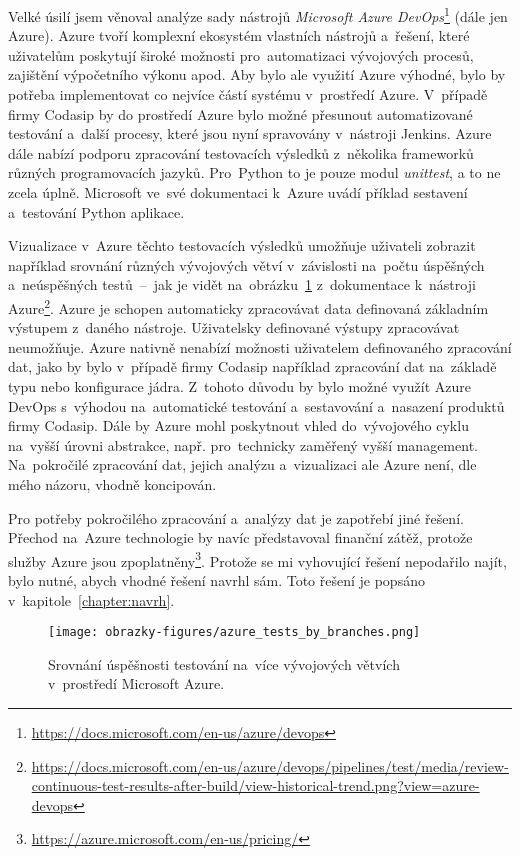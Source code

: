 Velké úsilí jsem věnoval analýze sady nástrojů \textit{Microsoft Azure DevOps}\footnote{\href{https://docs.microsoft.com/en-us/azure/devops}{https://docs.microsoft.com/en-us/azure/devops}}
(dále jen Azure). Azure tvoří komplexní ekosystém vlastních nástrojů a~řešení, které uživatelům poskytují široké
možnosti pro~automatizaci vývojových procesů, zajištění výpočetního výkonu apod. Aby bylo ale využití Azure výhodné,
bylo by potřeba implementovat co nejvíce částí systému v~prostředí Azure. V~případě firmy Codasip by do prostředí
Azure bylo možné přesunout automatizované testování a~další procesy, které jsou nyní spravovány v~nástroji Jenkins.
Azure dále nabízí podporu zpracování testovacích výsledků z~několika frameworků různých programovacích jazyků.
Pro~Python to je pouze modul \textit{unittest}, a to ne zcela úplně. Microsoft ve~své dokumentaci k~Azure uvádí
příklad sestavení a~testování Python aplikace.~\cite{AzurePythonDemo}

Vizualizace v~Azure těchto testovacích výsledků umožňuje uživateli zobrazit například srovnání různých vývojových
větví v~závislosti na~počtu úspěšných a~neúspěšných testů~--~jak je vidět na~obrázku~\ref{img:azure_tests_by_branches} z~dokumentace k~nástroji Azure\footnote{\href{https://docs.microsoft.com/en-us/azure/devops/pipelines/test/media/review-continuous-test-results-after-build/view-historical-trend.png?view=azure-devops}{https://docs.microsoft.com/en-us/azure/devops/pipelines/test/media/review-continuous-test-results-after-build/view-historical-trend.png?view=azure-devops}}. Azure je schopen automaticky zpracovávat data definovaná základním výstupem z~daného nástroje. Uživatelsky definované výstupy
zpracovávat neumožňuje. Azure nativně nenabízí možnosti uživatelem definovaného zpracování dat, jako by bylo v~případě firmy Codasip například zpracování dat na~základě typu nebo konfigurace jádra. Z~tohoto důvodu by bylo
možné využít Azure DevOps s~výhodou na~automatické testování a~sestavování a~nasazení produktů firmy Codasip. Dále by
Azure mohl poskytnout vhled do~vývojového cyklu na~vyšší úrovni abstrakce, např. pro~technicky zaměřený vyšší
management. Na~pokročilé zpracování dat, jejich analýzu a~vizualizaci ale Azure není, dle mého názoru, vhodně koncipován.

Pro potřeby pokročilého zpracování a~analýzy dat je zapotřebí jiné řešení. Přechod na~Azure technologie by navíc
představoval finanční zátěž, protože služby Azure jsou zpoplatněny\footnote{\href{https://azure.microsoft.com/en-us/pricing/}{https://azure.microsoft.com/en-us/pricing/}}. Protože se mi vyhovující řešení nepodařilo najít, bylo nutné, abych vhodné řešení navrhl sám. Toto řešení je popsáno v~kapitole~\ref{chapter:navrh}.
\begin{figure}[H]
	\centering
	\texttt{[image: obrazky-figures/azure\_tests\_by\_branches.png]}
	\caption[]{Srovnání úspěšnosti testování na~více vývojových větvích v~prostředí Microsoft Azure.}
	\label{img:azure_tests_by_branches}
\end{figure}

